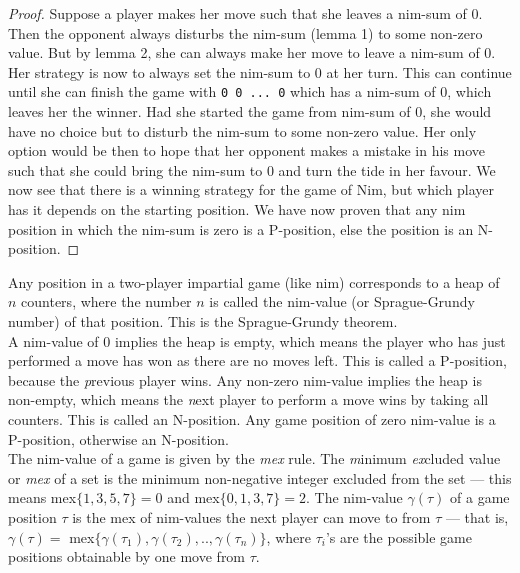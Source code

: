 \documentclass[a4paper, 12pt]{article}
\newcommand{\code}[1]{\colorbox{light-gray}{\texttt{#1}}}
\theoremstyle{remark} %
\begin{document}
\begin{proof}
	Suppose a player makes her move such that she leaves a nim-sum of $0$. Then the opponent always disturbs the nim-sum (lemma 1) to some non-zero value. But by lemma 2, she can always make her move to leave a nim-sum of $0$. Her strategy is now to always set the nim-sum to $0$ at her turn. This can continue until she can finish the game with \code{0 0 ... 0} which has a nim-sum of $0$, which leaves her the winner. Had she started the game from nim-sum of $0$, she would have no choice but to disturb the nim-sum to some non-zero value. Her only option would be then to hope that her opponent makes a mistake in his move such that she could bring the nim-sum to $0$ and turn the tide in her favour. We now see that there is a winning strategy for the game of Nim, but which player has it depends on the starting position. We have now proven that any nim position in which the nim-sum is zero is a P-position, else the position is an N-position.
\end{proof}

Any position in a two-player impartial game (like nim) corresponds to a heap of $n$ counters, where the number $n$ is called the nim-value (or Sprague-Grundy number) of that position. This is the Sprague-Grundy  theorem.\\

A nim-value of 0 implies the heap is empty, which means the player who has just performed a move has won as there are no moves left. This is called a P-position, because the \textit{p}revious player wins. Any non-zero nim-value implies the heap is non-empty, which means the \textit{n}ext player to perform a move wins by taking all counters. This is called an N-position. Any game position of zero nim-value is a P-position, otherwise an N-position.\\

The nim-value of a game is given by the \textit{mex} rule. The \textit{m}inimum \textit{ex}cluded value or \textit{mex}  of a set is the minimum non-negative integer excluded from the set --- this means mex$\{1,3,5,7\}=0$ and mex$\{0,1,3,7\}=2$. The nim-value $\gamma(\tau)$ of a game position $\tau$ is the mex of nim-values the next player can move to from $\tau$ --- that is, $\gamma(\tau)=$ mex$\{\gamma(\tau_1), \gamma(\tau_2), .., \gamma(\tau_n) \}$, where $\tau_i$'s are the possible game positions obtainable by one move from $\tau$.\\
\end{document}
